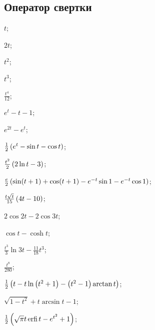 \subsection*{Оператор свертки}

	\begin{enumsols}

		\item \( t \); \sfill %
		\item \( 2t \); \sfill %
		\item \( t^2 \); \sfill %
		\item \( t^3 \); \sfill %
		\item \( \frac{t^4}{12} \); \sfill %
		\item \( e^t - t - 1 \); \sfill %
		\item \( e^{2t} - e^t \); \sfill %

		\item \( \frac{1}{2} \left( e^t - \sin{t} - \cos{t} \right) \); \sfill %
		\item \( \frac{t^2}{2} \left( 2\ln{t} - 3 \right) \); \sfill %
		\item \( \frac{e}{2} \left( \sin(t+1) + \cos(t+1) - e^{-t} \sin{1} - e^{-t} \cos{1} \right) \); \sfill %
		\item \( \frac{t\sqrt{t}}{15} \left( 4t - 10 \right) \); \sfill %
		\item \( 2 \cos{2t} - 2 \cos{3t} \); \sfill %
		\item \( \cos{t} - \cosh{t} \); \sfill %
		\item \( \frac{t^3}{3} \ln{3t} - \frac{11}{18}t^3 \); \sfill %
		\item \( \frac{t^8}{280} \); \sfill %
		\item \( \frac{1}{2} \left( t - t\ln\left( t^2+1 \right) - \left( t^2-1 \right) \arctan{t} \right) \); \sfill %
		\item \( \sqrt{1 - t^2} + t \arcsin{t} - 1 \); \sfill %
		\item \( \frac{1}{2} \left( \sqrt{\pi} t \operatorname{erfi}{t} - e^{t^2} + 1 \right) \); \sfill %


\end{enumsols}
